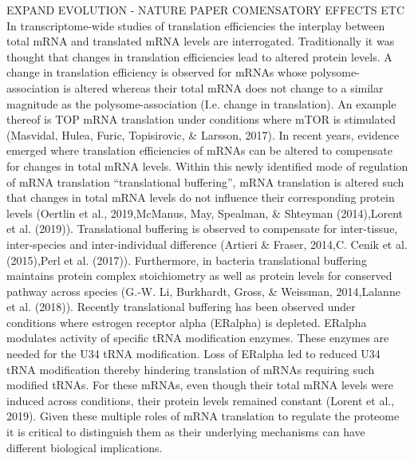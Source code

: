 \documentclass[12pt,openany]{book}
\begin{document}
EXPAND EVOLUTION - NATURE PAPER COMENSATORY EFFECTS ETC In
transcriptome-wide studies of translation efficiencies the interplay
between total mRNA and translated mRNA levels are interrogated.
Traditionally it was thought that changes in translation efficiencies
lead to altered protein levels. A change in translation efficiency is
observed for mRNAs whose polysome-association is altered whereas their
total mRNA does not change to a similar magnitude as the
polysome-association (I.e. change in translation). An example thereof is
TOP mRNA translation under conditions where mTOR is stimulated
(Masvidal, Hulea, Furic, Topisirovic, \& Larsson, 2017). In recent
years, evidence emerged where translation efficiencies of mRNAs can be
altered to compensate for changes in total mRNA levels. Within this
newly identified mode of regulation of mRNA translation ``translational
buffering'', mRNA translation is altered such that changes in total mRNA
levels do not influence their corresponding protein levels (Oertlin et
al., 2019,McManus, May, Spealman, \& Shteyman (2014),Lorent et al.
(2019)). Translational buffering is observed to compensate for
inter-tissue, inter-species and inter-individual difference (Artieri \&
Fraser, 2014,C. Cenik et al. (2015),Perl et al. (2017)). Furthermore, in
bacteria translational buffering maintains protein complex stoichiometry
as well as protein levels for conserved pathway across species (G.-W.
Li, Burkhardt, Gross, \& Weissman, 2014,Lalanne et al. (2018)). Recently
translational buffering has been observed under conditions where
estrogen receptor alpha (ERalpha) is depleted. ERalpha modulates
activity of specific tRNA modification enzymes. These enzymes are needed
for the U34 tRNA modification. Loss of ERalpha led to reduced U34 tRNA
modification thereby hindering translation of mRNAs requiring such
modified tRNAs. For these mRNAs, even though their total mRNA levels
were induced across conditions, their protein levels remained constant
(Lorent et al., 2019). Given these multiple roles of mRNA translation to
regulate the proteome it is critical to distinguish them as their
underlying mechanisms can have different biological implications.
\end{document}
